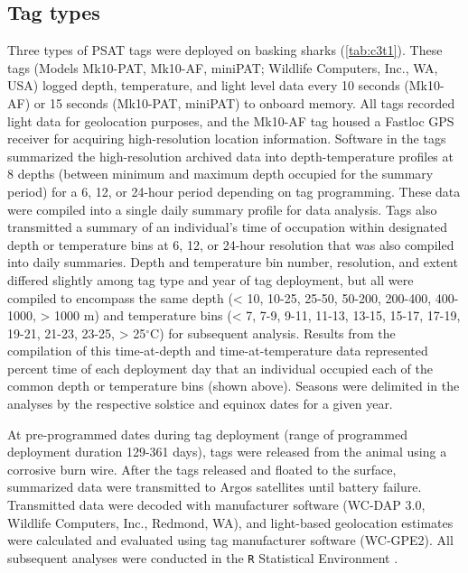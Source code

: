 \subsection{Tag types}
Three types of PSAT tags were deployed on basking sharks (\cref{tab:c3t1}). These tags (Models Mk10-PAT, Mk10-AF, miniPAT; Wildlife Computers, Inc., WA, USA) logged depth, temperature, and light level data every 10 seconds (Mk10-AF) or 15 seconds (Mk10-PAT, miniPAT) to onboard memory. All tags recorded light data for geolocation purposes, and the Mk10-AF tag housed a Fastloc GPS receiver for acquiring high-resolution location information. Software in the tags summarized the high-resolution archived data into depth-temperature profiles at 8 depths (between minimum and maximum depth occupied for the summary period) for a 6, 12, or 24-hour period depending on tag programming. These data were compiled into a single daily summary profile for data analysis. Tags also transmitted a summary of an individual's time of occupation within designated depth or temperature bins at 6, 12, or 24-hour resolution that was also compiled into daily summaries. Depth and temperature bin number, resolution, and extent differed slightly among tag type and year of tag deployment, but all were compiled to encompass the same depth (< 10, 10-25, 25-50, 50-200, 200-400, 400-1000, > 1000 m) and temperature bins (< 7, 7-9, 9-11, 11-13, 13-15, 15-17, 17-19, 19-21, 21-23, 23-25, > 25$^{\circ}$C) for subsequent analysis. Results from the compilation of this time-at-depth and time-at-temperature data represented percent time of each deployment day that an individual occupied each of the common depth or temperature bins (shown above). Seasons were delimited in the analyses by the respective solstice and equinox dates for a given year.

At pre-programmed dates during tag deployment (range of programmed deployment duration 129-361 days), tags were released from the animal using a corrosive burn wire. After the tags released and floated to the surface, summarized data were transmitted to Argos satellites until battery failure. Transmitted data were decoded with manufacturer software (WC-DAP 3.0, Wildlife Computers, Inc., Redmond, WA), and light-based geolocation estimates were calculated and evaluated using tag manufacturer software (WC-GPE2). All subsequent analyses were conducted in the \texttt{R} Statistical Environment \citep{RDevelopmentCoreTeam2015}. 

